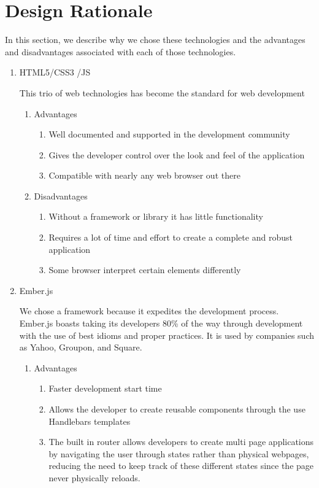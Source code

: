 \section{Design Rationale}
In this section, we describe why we chose these technologies and the advantages and disadvantages associated with each of those technologies. 
\begin{enumerate}
\item HTML5/CSS3 /JS \par This trio of web technologies has become the standard for web development
	\begin{enumerate}
		\item Advantages
		\begin{enumerate}
			\item Well documented and supported in the development community
			\item Gives the developer control over the look and feel of the application
			\item Compatible with nearly any web browser out there
		\end{enumerate}
		\item Disadvantages
		\begin{enumerate}
			\item Without a framework or library it has little functionality
			\item Requires a lot of time and effort to create a complete and robust application
			\item Some browser interpret certain elements differently
		\end{enumerate}
	\end{enumerate}
\item Ember.js \par We chose a framework because it expedites the development process. Ember.js boasts taking its developers 80\% of the way through development with the use of best idioms and proper practices. It is used by companies such as Yahoo, Groupon, and Square.
	\begin{enumerate}
		\item Advantages
		\begin{enumerate}
			\item Faster development start time
			\item Allows the developer to create reusable components through the use Handlebars templates
			\item The built in router allows developers to create multi page applications by navigating the user through states rather than physical webpages, reducing the need to keep track of these different states since the page never physically reloads. 

\end{enumerate}
\end{enumerate}
\end{enumerate}

